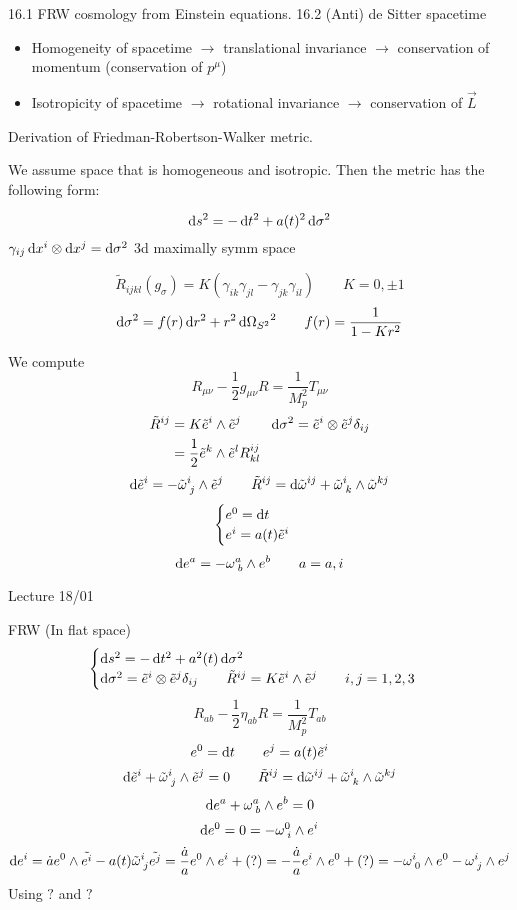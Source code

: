 16.1 FRW cosmology from Einstein equations. 16.2 (Anti) de Sitter spacetime

\begin{itemize}
\item Homogeneity of spacetime $\rightarrow$ translational invariance $\rightarrow$ conservation of momentum (conservation of $p^\mu$)
\item Isotropicity of spacetime $\rightarrow$ rotational invariance $\rightarrow$ conservation of $\vec{L}$
\end{itemize}



Derivation of Friedman-Robertson-Walker metric.

We assume space that is homogeneous and isotropic. Then the metric has the following form:

\[ \operatorname{d \!}{s}^2 = - \operatorname{d \!}{t}^2 + a(t)^2 \operatorname{d \!}{\sigma}^2 \]
$\gamma_{ij}\operatorname{d \!}{x^i}\otimes\operatorname{d \!}{x^j} = \operatorname{d \!}{\sigma}^2$ 3d maximally symm space

\[ \tilde{R}_{ijkl}(g_\sigma) = K (\gamma_{ik}\gamma_{jl}-\gamma_{jk}\gamma_{il}) \qquad K = 0,\pm 1 \]
\[ \operatorname{d \!}{\sigma}^2 = f(r) \operatorname{d \!}{r}^2 + r^2 \operatorname{d \!}{\Omega_{S^2}}^2 \qquad f(r) = \frac{1}{1-Kr^2} \]

We compute
\[ R_{\mu\nu} - \frac{1}{2}g_{\mu\nu}R = \frac{1}{M_p^2}T_{\mu\nu} \]
\begin{align*}
\tilde{R}^{ij} &= K\tilde{e}^i\wedge\tilde{e}^j \qquad \operatorname{d \!}{\sigma}^2 = \tilde{e}^i\otimes \tilde{e}^j \delta_{ij} \\ 
&= \frac{1}{2}\tilde{e}^k \wedge \tilde{e}^l R_{kl}^{ij}
\end{align*}
\[ \operatorname{d \!}{\tilde{e}^i} = -\tilde{\omega}^i_{\;j} \wedge \tilde{e}^j \qquad \tilde{R}^{ij} = \operatorname{d \!}{\tilde{\omega}^{ij}} + \tilde{\omega}^i_{\;k}\wedge \tilde{\omega}^{kj} \]
\[ \begin{cases}
e^0 = \operatorname{d \!}{t} \\
e^i = a(t)\tilde{e}^i
\end{cases} \]
\[ \operatorname{d \!}{e}^a = - \omega^a_{\;b}\wedge e^b \qquad a = a,i \]

Lecture 18/01

FRW
(In flat space)
\[ \begin{cases}
\operatorname{d \!}{s}^2 = - \operatorname{d \!}{t}^2 + a^2(t) \operatorname{d \!}{\sigma}^2 \\
\operatorname{d \!}{\sigma}^2 = \tilde{e}^i \otimes \tilde{e}^j \delta_{ij} \qquad \tilde{R}^{ij} = K \tilde{e}^i \wedge \tilde{e}^j \qquad i,j = 1,2,3
\end{cases} \]
\[ R_{ab} - \frac{1}{2}\eta_{ab}R = \frac{1}{M_p^2}T_{ab} \]
\[ e^0 = \operatorname{d \!}{t} \qquad e^j=a(t) \tilde{e}^i \]
\[ \operatorname{d \!}{\tilde{e}^i} + \tilde{\omega}^i_{\;j}\wedge \tilde{e}^j = 0 \qquad \tilde{R}^{ij} = \operatorname{d \!}{\tilde{\omega}}^{ij} + \tilde{\omega}^i_{\;k}\wedge \tilde{\omega}^{kj} \]
\[ \operatorname{d \!}{e^a}+\omega^a_{\;b}\wedge e^b = 0 \]
\[ \operatorname{d \!}{e^0} = 0 = -\omega^0_{\;i} \wedge e^i  \]
\[ \operatorname{d \!}{e^i} = \dot{a}e^0\wedge\tilde{e^i} - a(t)\tilde{\omega}^i_{\;j}\tilde{e^j} = \frac{\dot{a}}{a}e^0 \wedge e^i + (?) = - \frac{\dot{a}}{a}e^i\wedge e^0 + (?) = - \omega^i_{\;0} \wedge e^0 - \omega^i_{\;j}\wedge e^j \]
Using $?$ and $?$

